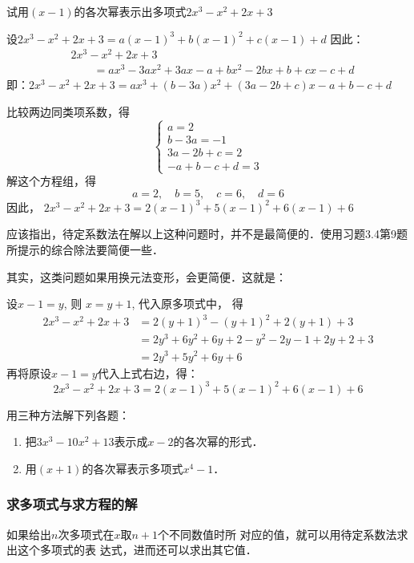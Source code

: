 \begin{example}
试用$(x-1)$的各次幂表示出多项式$2x^3-x^2+2x+3$
\end{example}


\begin{solution}
设$2x^3-x^2+2x+3=a(x-1)^3+b(x-1)^2+c(x-1)+d$
因此：
\[\begin{split}
    &2x^3-x^2+2x+3\\
&\qquad =ax^3-3ax^2+3ax-a+bx^2-2bx+b+cx-c+d
\end{split}\]
即：$2x^3-x^2+2x+3 =ax^3+(b-3a)x^2+(3a-2b+c)x-a+b-c+d$

比较两边同类项系数，得
\[\begin{cases}
    a=2\\
    b-3a=-1\\
    3a-2b+c=2\\
    -a+b-c+d=3
\end{cases}\]
解这个方程组，得
\[a=2,\quad b=5,\quad c=6,\quad d=6\]
因此，
$2x^3-x^2+2x+3 =2(x-1)^3+5(x-1)^2+6(x-1)+6$
\end{solution}

应该指出，待定系数法在解以上这种问题时，并不是最简便的．使用习题3.4第9题所提示的综合除法要简便一些．

其实，这类问题如果用换元法变形，会更简便．这就是：

设$x-1=y$, 则
$x=y+1$, 代入原多项式中，
得
\[\begin{split}
    2x^3-x^2+2x+3&=2(y+1)^3-(y+1)^2+2(y+1)+3\\
&=2y^3+6y^2+6y+2-y^2-2y-1+2y+2+3\\
&=2y^3+5y^2+6y+6
\end{split}\]
再将原设$x-1=y$代入上式右边，得：
$$2x^3-x^2+2x+3=2(x-1)^3+5(x-1)^2+6(x-1)+6$$

\begin{ex}
    用三种方法解下列各题：
\begin{enumerate}
    \item 把$3x^3-10x^2+13$表示成$x-2$的各次幂的形式．
    \item 用$(x+1)$的各次幂表示多项式$x^4-1$． 
\end{enumerate}
\end{ex}

\subsubsection{求多项式与求方程的解}

如果给出$n$次多项式在$x$取$n+1$个不同数值时所
对应的值，就可以用待定系数法求出这个多项式的表
达式，进而还可以求出其它值．


